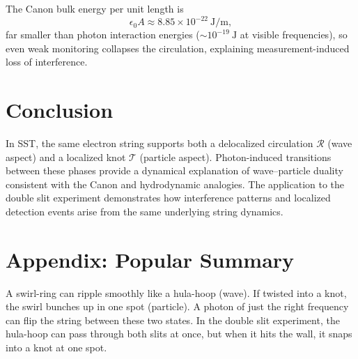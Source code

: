 \documentclass[11pt,a4paper]{article}
\begin{document}
        The Canon bulk energy per unit length is
        \[
            \epsilon_0 A \approx 8.85\times10^{-22}\ \mathrm{J/m},
        \]
        far smaller than photon interaction energies
        ($\sim 10^{-19}\ \mathrm{J}$ at visible frequencies),
        so even weak monitoring collapses the circulation,
        explaining measurement-induced loss of interference.

\section{Conclusion}

    In SST, the same electron string supports both
    a delocalized circulation $\mathcal R$ (wave aspect)
    and a localized knot $\mathcal T$ (particle aspect).
    Photon-induced transitions between these phases
    provide a dynamical explanation of wave--particle duality
    consistent with the Canon and hydrodynamic analogies.
    The application to the double slit experiment demonstrates how interference patterns and
    localized detection events arise from the same underlying string dynamics.

    \appendix
\section*{Appendix: Popular Summary}

    A swirl-ring can ripple smoothly like a hula-hoop (wave).
    If twisted into a knot, the swirl bunches up in one spot (particle).
    A photon of just the right frequency can flip the string between these two states.
    In the double slit experiment, the hula-hoop can pass through both slits at once,
    but when it hits the wall, it snaps into a knot at one spot.
\end{document}
